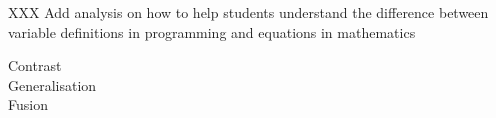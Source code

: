 XXX Add analysis on how to help students understand the difference between 
variable definitions in programming and equations in mathematics

\begin{description}
    \item[Contrast]
    \item[Generalisation]
    \item[Fusion]
\end{description}




